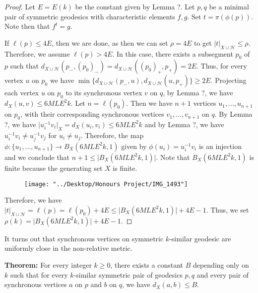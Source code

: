 \documentclass[12pt]{article}
\newcommand{\vs}{\vskip10pt}
\begin{document}
	\begin{proof}
		
		Let $E = E(k)$ be the constant given by Lemma ?. Let $p,q$ be a minimal pair of symmetric geodesics with characteristic elements $f,g$. Set $t = \pi(\phi(p))$. Note then that $f^t = g$. 
		
		\vs 
		
		If $\ell(p) \leq 4E$, then we are done, as then we can set $\rho = 4E$ to get $\vert t \vert_{X \cup \mathcal{H}} \leq \rho$. Therefore, we assume $\ell(p) > 4E$. In this case, there exists a subsegment $p_0$ of $p$ such that $d_{X \cup \mathcal{H}}(p_{-}, (p_0)_{-}) = d_{X \cup \mathcal{H}}((p_0)_{+}, p_{+}) = 2E$. Thus, for every vertex $u$ on $p_0$ we have $\min\{d_{X \cup \mathcal{H}}(p_{-}, u), d_{X \cup \mathcal{H}}(u, p_{+})\} \geq 2E$. Projecting each vertex $u$ on $p_0$ to its synchronous vertex $v$ on $q$, by Lemma ?, we have $d_X(u,v) \leq 6ML E^2 k$. Let $n = \ell(p_0)$. Then we have $n+1$ vertices $u_1,...,u_{n+1}$ on $p_0$, with their corresponding synchronous vertices $v_1,...,v_{n+1}$ on $q$. By Lemma ?, we have $\vert u_i^{-1} v_i \vert_X = d_X (u_i,v_i) \leq 6ML E^2 k$ and by Lemma ?, we have $u_i^{-1} v_i \neq u_j^{-1} v_j$ for $u_i \neq u_j$. Therefore, the map $\phi: \{u_1,...,u_{n+1}\} \rightarrow B_X(6MLE^2 k, 1)$ given by $\phi(u_i) = u_i^{-1} v_i$ is an injection and we conclude that $n + 1 \leq \vert B_X(6MLE^2 k, 1) \vert$. Note that $B_X(6MLE^2 k, 1)$ is finite because the generating set $X$ is finite. 
		
\begin{figure}
	\centering
	\texttt{[image: "../Desktop/Honours Project/IMG\_1493"]}
	\caption{}
	\label{fig:img1493}
\end{figure}
		
		\vs 
		
		Therefore, we have $\vert t \vert_{X \cup \mathcal{H}} = \ell(p) = \ell(p_0) + 4E \leq \vert B_X(6MLE^2 k, 1) \vert + 4E - 1$. Thus, we set $\rho(k) = \vert B_X(6MLE^2 k, 1) \vert + 4E - 1$. 
		
	\end{proof}
	
	It turns out that synchronous vertices on symmetric $k$-similar geodesic are uniformly close in the non-relative metric.
	
	\vs
	
	\textbf{Theorem: } For every integer $k \geq 0$, there exists a constant $B$ depending only on $k$ such that for every $k$-similar symmetric pair of geodesics $p,q$ and every pair of synchronous vertices $a$ on $p$ and $b$ on $q$, we have $d_X(a,b) \leq B$.
	
\end{document}
